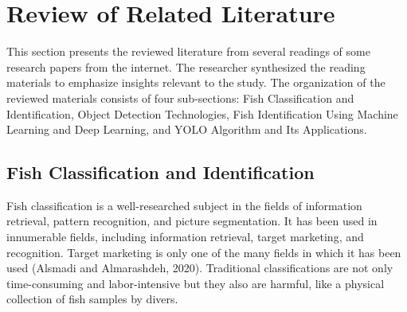 \chapter{Review of Related Literature}
This section presents the reviewed literature from several readings of some research papers from the internet. The researcher synthesized the reading materials to emphasize insights relevant to the study. The organization of the reviewed materials consists of four sub-sections: Fish Classification and Identification, Object Detection Technologies, Fish Identification Using Machine Learning and Deep Learning, and YOLO Algorithm and Its Applications.
\section{Fish Classification and Identification}
Fish classification is a well-researched subject in the fields of information retrieval, pattern recognition, and picture segmentation. It has been used in innumerable fields, including information retrieval, target marketing, and recognition. Target marketing is only one of the many fields in which it has been used (Alsmadi and Almarashdeh, 2020). Traditional classifications are not only time-consuming and labor-intensive but they also are harmful, like a physical collection of fish samples by divers. 
